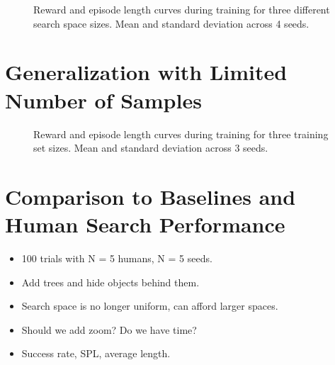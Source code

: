 
\begin{figure}
    \centering
    
    
    
    \label{fig:train-shape}
    \caption[Search space size learning curve.]{Reward and episode length curves during training for three different search space sizes. Mean and standard deviation across 4 seeds.}
\end{figure}

\section{Generalization with Limited Number of Samples}

\begin{figure}
    \centering
    
    
    \label{fig:samples}
    \caption[Generalization results.]{Reward and episode length curves during training for three training set sizes. Mean and standard deviation across 3 seeds.}
\end{figure}


\section{Comparison to Baselines and Human Search Performance}

\begin{itemize}
    \item 100 trials with N = 5 humans, N = 5 seeds.
    \item Add trees and hide objects behind them.
    \item Search space is no longer uniform, can afford larger spaces.
    \item Should we add zoom? Do we have time?
    \item Success rate, SPL, average length.
\end{itemize}